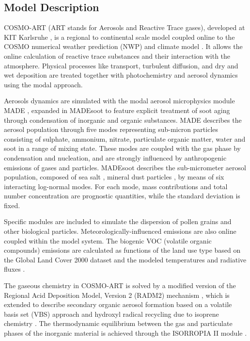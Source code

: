 \subsection{Model Description}
\label{subsec:1.1}
COSMO-ART  (ART  stands  for   Aerosols  and  Reactive  Trace  gases),
developed  at  KIT  Karlsruhe  \citep{Vogel-2009}, is  a  regional  to
continental scale model coupled  online to the COSMO numerical weather
prediction (NWP) and climate model \citep{Baldauf-2011}. It allows the
online calculation of reactive  trace substances and their interaction
with  the atmosphere.   Physical processes  like  transport, turbulent
diffusion,  and  dry and  wet  deposition  are  treated together  with
photochemistry and aerosol dynamics using the modal approach.

Aerosols dynamics  are simulated  with the modal  aerosol microphysics
module  MADE \citep{Ackermann-1998}, expanded  in MADEsoot  to feature
explicit  treatment of  soot aging  through condensation  of inorganic
\citep{Riemer-2003} and organic substances. MADE describes the aerosol
population  through  five   modes  representing  sub-micron  particles
consisting of sulphate, ammonium, nitrate, particulate organic matter,
water and soot  \citep{Riemer-2004} in a range of  mixing state. These
modes are coupled  with the gas phase by  condensation and nucleation,
and are  strongly influenced by  anthropogenic emissions of  gases and
particles. MADEsoot  describes the sub-micrometer  aerosol population,
composed  of sea  salt \citep{Lundgren-2013},  mineral  dust particles
\citep{Vogel-2006,  Stanelle-2010},   by  means  of   six  interacting
log-normal modes.  For each  mode, mass contributions and total number
concentration are prognostic  quantities, while the standard deviation
is fixed.

Specific  modules are included  to simulate  the dispersion  of pollen
grains    \citep{Vogel-2008}   and    other    biological   particles.
Meteorologically-influenced emissions  are also online  coupled within
the  model  system.  The  biogenic  VOC  (volatile organic  compounds)
emissions are  calculated as functions of  the land use  type based on
the Global  Land Cover 2000  dataset and the modeled  temperatures and
radiative fluxes \citep{Vogel-1995}.

The gaseous chemistry in COSMO-ART  is solved by a modified version of
the  Regional  Acid  Deposition  Model, Version  2  (RADM2)  mechanism
\citep{Stockwell-1990},  which  is   extended  to  describe  secondary
organic aerosol formation based on a volatile basis set (VBS) approach
\citep{Athanasopoulou-2013}  and  hydroxyl  radical recycling  due  to
isoprene chemistry \citep{Geiger-2003}.  The thermodynamic equilibrium
between the  gas and particulate  phases of the inorganic  material is
achieved through the  ISORROPIA II module \citep{Fountoukis-2007}. 

